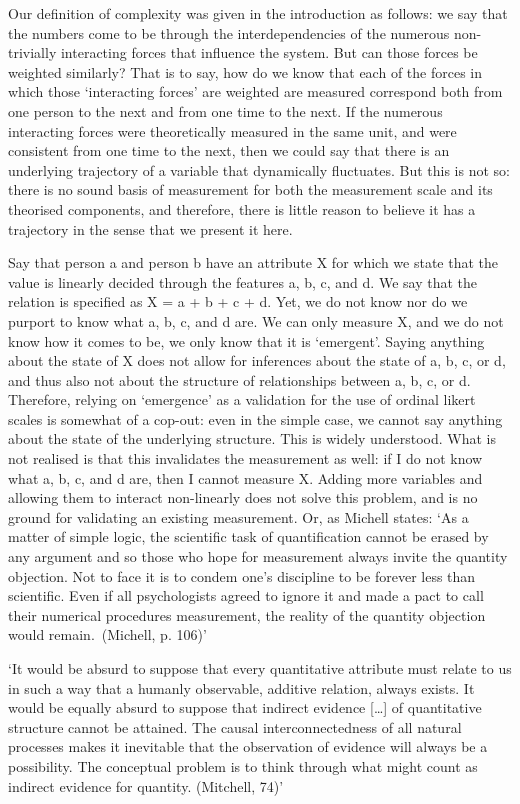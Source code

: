 \documentclass[utf8]{FrontiersinVancouver}
\begin{document}
Our definition of complexity was given in the introduction as follows: we say that the numbers come to be through the interdependencies of the numerous non-trivially interacting forces that influence the system. But can those forces be weighted similarly? That is to say, how do we know that each of the forces in which those `interacting forces' are weighted are measured correspond both from one person to the next and from one time to the next. If the numerous interacting forces were theoretically measured in the same unit, and were consistent from one time to the next, then we could say that there is an underlying trajectory of a variable that dynamically fluctuates. But this is not so: there is no sound basis of measurement for both the measurement scale and its theorised components, and therefore, there is little reason to believe it has a trajectory in the sense that we present it here.

Say that person a and person b have an attribute X for which we state that the value is linearly decided through the features a, b, c, and d. We say that the relation is specified as X = a + b + c + d. Yet, we do not know nor do we purport to know what a, b, c, and d are. We can only measure X, and we do not know how it comes to be, we only know that it is `emergent'. Saying anything about the state of X does not allow for inferences about the state of a, b, c, or d, and thus also not about the structure of relationships between a, b, c, or d. Therefore, relying on `emergence' as a validation for the use of ordinal likert scales is somewhat of a cop-out: even in the simple case, we cannot say anything about the state of the underlying structure. This is widely understood. What is not realised is that this invalidates the measurement as well: if I do not know what a, b, c, and d are, then I cannot measure X. Adding more variables and allowing them to interact non-linearly does not solve this problem, and is no ground for validating an existing measurement. Or, as Michell states: `As a matter of simple logic, the scientific task of quantification cannot be erased by any argument and so those who hope for measurement always invite the quantity objection. Not to face it is to condem one's discipline to be forever less than scientific. Even if all psychologists agreed to  ignore it and made a pact to call their numerical procedures measurement, the reality of the quantity objection would remain.\ (Michell, p. 106)'



    `It would be absurd to suppose that every quantitative attribute must relate to us in such a way that a humanly observable, additive relation, always exists. It would be equally absurd to suppose that indirect evidence [\ldots] of quantitative structure cannot be attained. The causal interconnectedness of all natural processes makes it inevitable that the observation of evidence will always be a possibility. The conceptual problem is to think through what might count as indirect evidence for quantity. (Mitchell, 74)'
\end{document}
